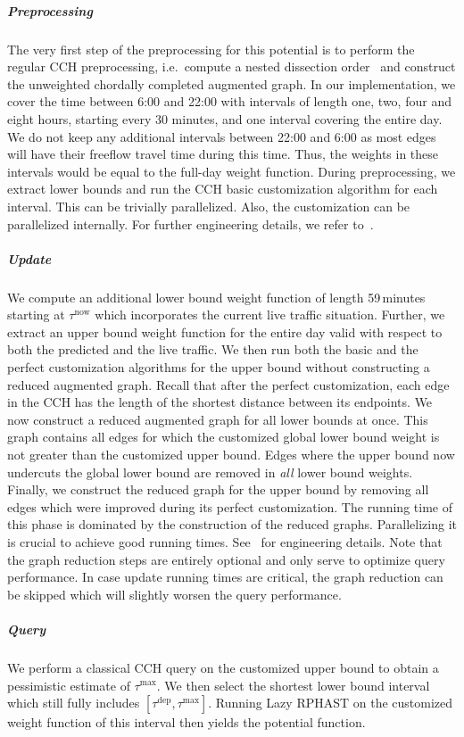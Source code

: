 \documentclass[a4paper,UKenglish,cleveref, autoref, thm-restate,anonymous]{lipics-v2021}
\newcommand*{\tdep}{\tau^{\operatorname{dep}}}
\newcommand*{\tmax}{\tau^{\max}}
\begin{document}
\subparagraph{Preprocessing}
The very first step of the preprocessing for this potential is to perform the regular CCH preprocessing, i.e.\ compute a nested dissection order~\cite{ghuw-fbndocch-19} and construct the unweighted chordally completed augmented graph.
In our implementation,
we cover the time between 6:00 and 22:00 with intervals of length one, two, four and eight hours, starting every 30 minutes,
and one interval covering the entire day.
We do not keep any additional intervals between 22:00 and 6:00 as most edges will have their freeflow travel time during this time.
Thus, the weights in these intervals would be equal to the full-day weight function.
During preprocessing, we extract lower bounds and run the CCH basic customization algorithm for each interval.
This can be trivially parallelized.
Also, the customization can be parallelized internally.
For further engineering details, we refer to~\cite{dsw-cch-15,bsw-rttau-19}.

\subparagraph{Update}
We compute an additional lower bound weight function of length 59\,minutes starting at $\tau^{\operatorname{now}}$ which incorporates the current live traffic situation.
Further, we extract an upper bound weight function for the entire day valid with respect to both the predicted and the live traffic.
We then run both the basic and the perfect customization algorithms for the upper bound without constructing a reduced augmented graph.
Recall that after the perfect customization, each edge in the CCH has the length of the shortest distance between its endpoints.
We now construct a reduced augmented graph for all lower bounds at once.
This graph contains all edges for which the customized global lower bound weight is not greater than the customized upper bound.
Edges where the upper bound now undercuts the global lower bound are removed in \emph{all} lower bound weights.
Finally, we construct the reduced graph for the upper bound by removing all edges which were improved during its perfect customization.
The running time of this phase is dominated by the construction of the reduced graphs.
Parallelizing it is crucial to achieve good running times.
See~\cite{bsw-rttau-19} for engineering details.
Note that the graph reduction steps are entirely optional and only serve to optimize query performance.
In case update running times are critical, the graph reduction can be skipped which will slightly worsen the query performance.

\subparagraph{Query}
We perform a classical CCH query on the customized upper bound to obtain a pessimistic estimate of $\tmax$.
We then select the shortest lower bound interval which still fully includes $[\tdep,\tmax]$.
Running Lazy RPHAST on the customized weight function of this interval then yields the potential function.
\end{document}
